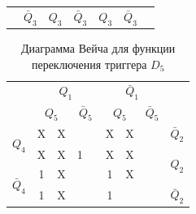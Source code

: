 \documentclass[a4paper,14pt]{article}
\begin{document}
\begin{table}[H]
\begin{center}
\begin{tabular}{cccccccccc}
	              \multicolumn{1}{l}{}                & \multicolumn{1}{l}{$\bar{Q}_3$} & \multicolumn{2}{l}{$Q_3$}                                      & \multicolumn{2}{l}{$\bar{Q}_3$}                & \multicolumn{2}{l}{$Q_3$}                                       & \multicolumn{1}{l}{$\bar{Q}_3$} &  \multicolumn{1}{l}{}
\end{tabular}
\end{center}
\end{table}


\begin{table}[H]
	\begin{center}
		\caption{\label{tab:D5_tab} Диаграмма Вейча для функции переключения триггера $D_5$ }
		\begin{tabular}{cccccccccc}
			                                                  &                                         \multicolumn{4}{c}{$Q_1$}                                         &                                      \multicolumn{4}{c}{$\bar{Q}_1$}                                      &                        \\
			                                                  &                \multicolumn{2}{c}{$Q_5$}                 &        \multicolumn{2}{c}{$\bar{Q}_5$}         &            \multicolumn{2}{c}{$Q_5$}            &             \multicolumn{2}{c}{$\bar{Q}_5$}             &                        \\ \cline{2-9}
			   \multicolumn{1}{c|}{\multirow{2}{*}{$Q_4$}}    &     \multicolumn{1}{c|}{X}      & \multicolumn{1}{c|}{X} & \multicolumn{1}{c|}{}  & \multicolumn{1}{c|}{} & \multicolumn{1}{c|}{X} & \multicolumn{1}{c|}{X} & \multicolumn{1}{c|}{} &      \multicolumn{1}{c|}{}      &      $\bar{Q}_2$       \\ \cline{2-9}
			              \multicolumn{1}{c|}{}               &     \multicolumn{1}{c|}{X}      & \multicolumn{1}{c|}{X} & \multicolumn{1}{c|}{1} & \multicolumn{1}{c|}{} & \multicolumn{1}{c|}{X} & \multicolumn{1}{c|}{X} & \multicolumn{1}{c|}{} &      \multicolumn{1}{c|}{}      & \multirow{2}{*}{$Q_2$} \\ \cline{2-9}
			\multicolumn{1}{c|}{\multirow{2}{*}{$\bar{Q}_4$}} &     \multicolumn{1}{c|}{1}      & \multicolumn{1}{c|}{X} & \multicolumn{1}{c|}{}  & \multicolumn{1}{c|}{} & \multicolumn{1}{c|}{1} & \multicolumn{1}{c|}{X} & \multicolumn{1}{c|}{} &      \multicolumn{1}{c|}{}      &                        \\ \cline{2-9}
			              \multicolumn{1}{c|}{}               &     \multicolumn{1}{c|}{1}      & \multicolumn{1}{c|}{X} & \multicolumn{1}{c|}{}  & \multicolumn{1}{c|}{} & \multicolumn{1}{c|}{1} & \multicolumn{1}{c|}{}  & \multicolumn{1}{c|}{} &      \multicolumn{1}{c|}{}      &      $\bar{Q}_2$       \\ \cline{2-9}

\end{tabular}
\end{center}
\end{table}
\end{document}
